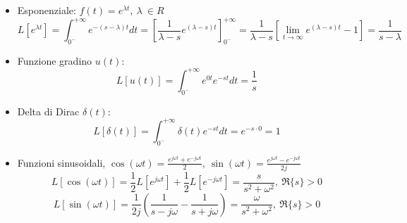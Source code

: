 \begin{itemize}
\item Esponenziale: $f(t) = e^{\lambda t},\ \lambda\ \in R $ 
$$
L\left[e^{\lambda t}\right] = \int_{0^-}^{+\infty} e^{-(s-\lambda) t} dt = \left[\frac{1}{\lambda -s}e^{(\lambda -s)t}\right]_{0^-}^{+\infty} = \frac{1}{\lambda -s} \left[\lim_{t\to\infty}e^{(\lambda-s)t}-1\right] =
\frac{1}{s-\lambda}
$$
\item Funzione gradino $u(t)$:
$$
L[u(t)] = \int_{0^-}^{+\infty}e^{0t}e^{-st}dt = \frac{1}{s}
$$
\item Delta di Dirac $\delta(t)$:
$$
L[\delta(t)] = \int_{0^-}^{+\infty}\delta(t) e^{-st}dt = e^{-s\cdot 0} = 1
$$
\item Funzioni sinusoidali, $\cos(\omega t)=\frac{e^{j\omega t}+e^{-j\omega t}}{2},\ \sin(\omega t) = \frac{e^{j\omega t}-e^{-j\omega t}}{2j}$
$$
L[\cos(\omega t)] = \frac{1}{2} L[e^{j\omega t}] + \frac{1}{2} L[e^{-j\omega t}] = \frac{s}{s^2+\omega^2},\ \Re\{s\} > 0
$$
$$
L[\sin(\omega t)] = \frac{1}{2j}\left(\frac{1}{s-j\omega}-\frac{1}{s+j\omega}\right) = \frac{\omega}{s^2+\omega^2},\ \Re\{ s\} > 0
$$
\end{itemize}

